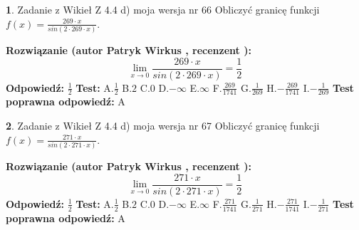 \documentclass[12pt, a4paper]{article}
\theoremstyle{definition} %
\newtheorem{zad}{}
\newcommand{\zadStart}[1]{\begin{zad}#1\newline}
\newcommand{\zadStop}{\end{zad}}
\newcommand{\rozwStart}[2]{\noindent \textbf{Rozwiązanie (autor #1 , recenzent #2): }\newline}
\newcommand{\rozwStop}{\newline}
\newcommand{\odpStart}{\noindent \textbf{Odpowiedź:}\newline}
\newcommand{\odpStop}{\newline}
\newcommand{\testStart}{\noindent \textbf{Test:}\newline}
\newcommand{\testStop}{\newline}
\newcommand{\kluczStart}{\noindent \textbf{Test poprawna odpowiedź:}\newline}
\newcommand{\kluczStop}{\newline}
\begin{document}
\zadStart{Zadanie z Wikieł Z 4.4 d) moja wersja nr 66}
Obliczyć granicę funkcji $f(x)=\frac{269\cdot x}{sin(2 \cdot269\cdot x)}$.
\zadStop
\rozwStart{Patryk Wirkus}{}
$$\lim\limits_{x\to 0}\frac{269\cdot x}{sin(2 \cdot269\cdot x)}=\frac{1}{2}$$
\rozwStop
\odpStart
$\frac{1}{2}$
\odpStop
\testStart
A.$\frac{1}{2}$
B.$2$
C.$0$
D.$-\infty$
E.$\infty$
F.$\frac{269}{1741}$
G.$\frac{1}{269}$
H.$-\frac{269}{1741}$
I.$-\frac{1}{269}$
\testStop
\kluczStart
A
\kluczStop



\zadStart{Zadanie z Wikieł Z 4.4 d) moja wersja nr 67}
Obliczyć granicę funkcji $f(x)=\frac{271\cdot x}{sin(2 \cdot271\cdot x)}$.
\zadStop
\rozwStart{Patryk Wirkus}{}
$$\lim\limits_{x\to 0}\frac{271\cdot x}{sin(2 \cdot271\cdot x)}=\frac{1}{2}$$
\rozwStop
\odpStart
$\frac{1}{2}$
\odpStop
\testStart
A.$\frac{1}{2}$
B.$2$
C.$0$
D.$-\infty$
E.$\infty$
F.$\frac{271}{1741}$
G.$\frac{1}{271}$
H.$-\frac{271}{1741}$
I.$-\frac{1}{271}$
\testStop
\kluczStart
A
\kluczStop
\end{document}
